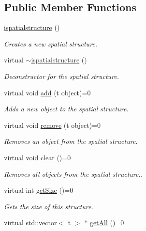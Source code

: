 \subsection*{Public Member Functions}
\begin{DoxyCompactItemize}
\item 
\hyperlink{classflounder_1_1ispatialstructure_a0dbd26803384536ee69667f057b0d436}{ispatialstructure} ()
\begin{DoxyCompactList}\small\item\em Creates a new spatial structure. \end{DoxyCompactList}\item 
virtual \hyperlink{classflounder_1_1ispatialstructure_a355b10082dc172d15e1adbadba6c7f2b}{$\sim$ispatialstructure} ()
\begin{DoxyCompactList}\small\item\em Deconstructor for the spatial structure. \end{DoxyCompactList}\item 
virtual void \hyperlink{classflounder_1_1ispatialstructure_abd7886a29a4c6ec867ec0f611f5a667b}{add} (t object)=0
\begin{DoxyCompactList}\small\item\em Adds a new object to the spatial structure. \end{DoxyCompactList}\item 
virtual void \hyperlink{classflounder_1_1ispatialstructure_afca84e244d4bf34d474f0c2456d493b1}{remove} (t object)=0
\begin{DoxyCompactList}\small\item\em Removes an object from the spatial structure. \end{DoxyCompactList}\item 
virtual void \hyperlink{classflounder_1_1ispatialstructure_a422fac0231ea3095e2f85951259a4686}{clear} ()=0
\begin{DoxyCompactList}\small\item\em Removes all objects from the spatial structure.. \end{DoxyCompactList}\item 
virtual int \hyperlink{classflounder_1_1ispatialstructure_a9daf7778a9bde304e08070eaeffb8fbd}{get\+Size} ()=0
\begin{DoxyCompactList}\small\item\em Gets the size of this structure. \end{DoxyCompactList}\item 
virtual std\+::vector$<$ t $>$ $\ast$ \hyperlink{classflounder_1_1ispatialstructure_a481b04135e2ed57ab8f29d09301dce7e}{get\+All} ()=0

\end{DoxyCompactItemize}
